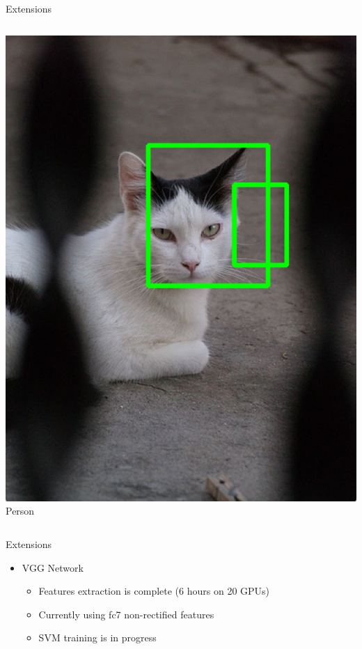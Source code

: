 \documentclass[compress,aspectratio=43]{beamer}
\begin{document}
\begin{frame}{Extensions}
{\begin{columns}
\begin{column}{0.3\textwidth}
    		\includegraphics[width=1\linewidth]{figures/sgd/person.png} \\
    		{\scriptsize Person}
		\end{column}
	\end{columns}
}
\end{frame}

\begin{frame}{Extensions}
 {
    \begin{itemize}
    \item VGG Network
        \begin{itemize}
            \item Features extraction is complete (6 hours on 20 GPUs)
            \item Currently using fc7 non-rectified features
            \item SVM training is in progress
        \end{itemize}
    \end{itemize}
}
\end{frame}
\end{document}
